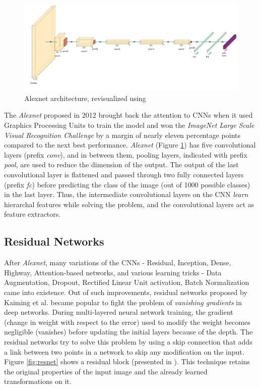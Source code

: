 \begin{figure}[ht]
\centering
\includegraphics[width=\textwidth]{images/alexnet/alexnet.png}
  \caption{Alexnet \cite{krizhevsky2012imagenet} architecture, revisualized using \cite{haris_iqbal_2018_2526396}}
  \label{fig:alex-net}
\end{figure}

The \textit{Alexnet} \cite{krizhevsky2012imagenet} proposed in 2012 brought back the attention to CNNs when it used Graphics Processing Units to train the model and won the \textit{ImageNet Large Scale Visual Recognition Challenge} \cite{russakovsky2015ILSVRC} by a margin of nearly eleven percentage points compared to the next best performance. \textit{Alexnet} (Figure \ref{fig:alex-net}) has five convolutional layers (prefix \textit{conv}), and in between them, pooling layers, indicated with prefix \textit{pool}, are used to reduce the dimension of the output. The output of the last convolutional layer is flattened and passed through two fully connected layers (prefix \textit{fc}) before predicting the class of the image (out of 1000 possible classes) in the last layer. Thus, the intermediate convolutional layers on the CNN \textit{learn} hierarchal features while solving the problem, and the convolutional layers act as feature extractors.

\subsection{Residual Networks}

After \textit{Alexnet}, many variations of the CNNs - Residual, Inception, Dense, Highway, Attention-based networks, and various learning tricks - Data Augmentation, Dropout, Rectified Linear Unit activation, Batch Normalization came into existence. Out of such improvements, residual networks proposed by Kaiming et al. \cite{He2016DeepRL} became popular to fight the problem of \textit{vanishing gradients} in deep networks. During multi-layered neural network training, the gradient (change in weight with respect to the error) used to modify the weight becomes negligible (vanishes) before updating the initial layers because of the depth. The residual networks try to solve this problem by using a skip connection that adds a link between two points in a network to skip any modification on the input. Figure \ref{fig:resnet} shows a residual block (presented in \cite{He2016DeepRL}). This technique retains the original properties of the input image and the already learned transformations on it.

